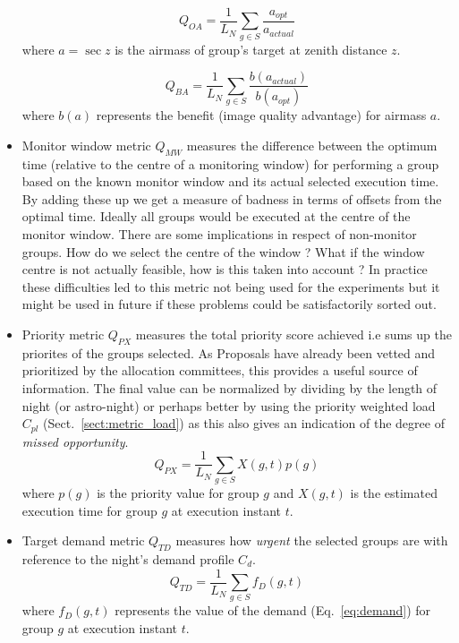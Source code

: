 \begin{itemize}
\begin{equation}
Q_{OA} = \frac{1}{L_N}\sum_{g \in S}{\frac{a_{opt}}{a_{actual}}}
\end{equation}
where $a = \sec{z}$ is the airmass of group's target at zenith distance $z$.

\begin{equation}
Q_{BA} = \frac{1}{L_N}\sum_{g \in S}{\frac{b(a_{actual})}{b(a_{opt})}}
\end{equation}
where $b(a)$ represents the benefit (image quality advantage) for airmass $a$.

\item Monitor window metric $Q_{MW}$  measures the difference between the optimum time (relative to the centre of a monitoring window) for performing a group based on the known monitor window and its actual selected execution time. By adding these up we get a measure of badness in terms of offsets from the optimal time. Ideally all groups would be executed at the centre of the monitor window. There are some implications in respect of non-monitor groups. How do we select the centre of the window ? What if the window centre is not actually feasible, how is this taken into account ? In practice these difficulties led to this metric not being used for the experiments but it might be used in future if these problems could be satisfactorily sorted out.

\item Priority metric $Q_{PX}$  measures the total priority score achieved i.e  sums up the priorites of the groups selected. As Proposals have already been vetted and prioritized by the allocation committees, this provides a useful source of information.  The final value can be normalized by dividing by the length of night (or astro-night) or perhaps better by using the priority weighted load $C_{pl}$ (Sect.~\ref{sect:metric_load}) as this also gives an indication of the degree of \emph{missed opportunity}.
\begin{equation}
Q_{PX} = \frac{1}{L_N}\sum_{g \in S}{X(g,t)p(g)}
\end{equation}
where $p(g)$ is the priority value for group $g$ and $X(g,t)$ is the estimated execution time for group $g$ at execution instant $t$.

\item Target demand metric $Q_{TD}$  measures how \emph{urgent} the selected groups are with reference to the night's demand profile $C_d$.
\begin{equation}
Q_{TD} = \frac{1}{L_N}\sum_{g \in S}{f_D(g,t)}
\end{equation}
where $f_D(g,t)$ represents the value of the demand (Eq.~\ref{eq:demand}) for group $g$ at execution instant $t$. 


\end{itemize}
